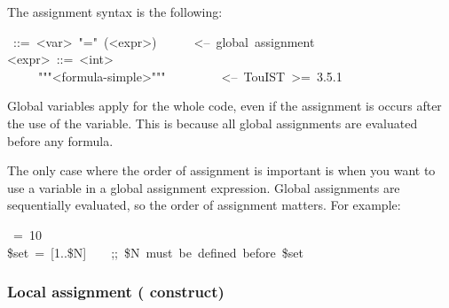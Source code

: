 The assignment syntax is the following:%
\begin{mdpre}%
~::=~{\textless{}var\textgreater{}}~"="~({\textless{}expr\textgreater{}})~~~~~~{\textless{}--~global~assignment}\\
{\textless{}expr\textgreater{}}~::=~{\textless{}int\textgreater{}}\\
~~~~\textbar{}~"""{\textless{}formula-simple\textgreater{}}"""~~~~~~~~~{\textless{}--~TouIST~\textgreater{}=~3.5.1}%
\end{mdpre}\noindent Global variables apply for the whole code, even if the assignment is
occurs after the use of the variable. This is because all global
assignments are evaluated before any formula.

The only case where the order of assignment is important is when you
want to use a variable in a global assignment expression. Global
assignments are sequentially evaluated, so the order of assignment
matters. For example:%
\begin{mdpre}%
~=~{10}\\
{\$set}~=~{}[{1}..{\$N}]~~~~{;;~\$N~must~be~defined~before~\$set}%
\end{mdpre}
\subsubsection{Local assignment ( construct)}\label{let-binding}%

